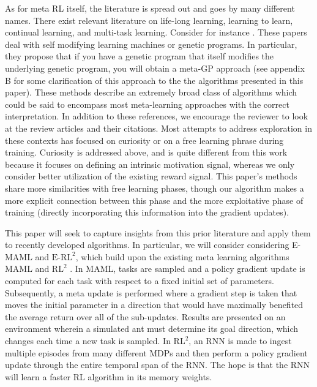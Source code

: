 \documentclass{article} %
\begin{document}
As for meta RL itself, the literature is spread out and goes by many different names. There exist relevant literature on life-long learning, learning to learn, continual learning, and multi-task learning. Consider for instance \cite{schex5, schex6}. These papers deal with self modifying learning machines or genetic programs. In particular, they propose that if you have a genetic program that itself modifies the underlying genetic program, you will obtain a meta-GP approach (see appendix B for some clarification of this approach to the the algorithms presented in this paper). These methods describe an extremely broad class of algorithms which could be said to encompass most meta-learning approaches with the correct interpretation. In addition to these references, we encourage the reviewer to look at the review articles \cite{lllrev, tlrev, thurn} and their citations. Most attempts to address exploration in these contexts has focused on curiosity or on a free learning phrase during training. Curiosity is addressed above, and is quite different from this work because it focuses on defining an intrinsic motivation signal, whereas we only consider better utilization of the existing reward signal. This paper's methods share more similarities with free learning phases, though our algorithm makes a more explicit connection between this phase and the more exploitative phase of training (directly incorporating this information into the gradient updates).  


This paper will seek to capture insights from this prior literature and apply them to recently developed algorithms. In particular, we will consider considering E-MAML and  $\text{E-RL}^2$, which build upon the existing meta learning algorithms MAML \citep{maml} and $\text{RL}^2$ \citep{rl2}. In MAML, tasks are sampled and a policy gradient update is computed for each task with respect to a fixed initial set of parameters. Subsequently, a meta update is performed where a gradient step is taken that moves the initial parameter in a direction that would have maximally benefited the average return over all of the sub-updates. Results are presented on an environment wherein a simulated ant must determine its goal direction, which changes each time a new task is sampled. In $ \text{RL}^2$, an RNN is made to ingest multiple episodes from many different MDPs and then perform a policy gradient update through the entire temporal span of the RNN. The hope is that the RNN will learn a faster RL algorithm in its memory weights. 
\end{document}
